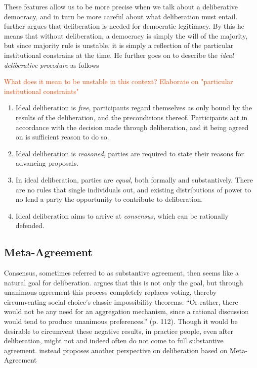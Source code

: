 These features allow us to be more precise when we talk about a deliberative democracy, and in turn be more careful about what deliberation must entail. \citet{cohenDeliberationDemocraticLegimitimacy2002} further argues that deliberation is needed for democratic legitimacy. By this he means that without deliberation, a democracy is simply the will of the majority, but since majority rule is unstable, it is simply a reflection of the particular institutional constrains at the time. He further goes on to describe the \emph{ideal deliberative procedure} as follows

\textcolor{OrangeRed}{What does it mean to be unstable in this context? Elaborate on "particular institutional constraints"}

\begin{enumerate}
	\label{list:ideal-deliberation}
	\setlength\itemsep{1px}
	\item  Ideal deliberation is \emph{free}, participants regard themselves as only bound by the results of the deliberation, and the preconditions thereof. Participants act in accordance with the decision made through deliberation, and it being agreed on is sufficient reason to do so.
	\item  Ideal deliberation is \emph{reasoned}, parties are required to state their reasons for advancing proposals.
	\item  In ideal deliberation, parties are \emph{equal}, both formally and substantively. There are no rules that single individuals out, and existing distributions of power to no lend a party the opportunity to contribute to deliberation.
	\item  Ideal deliberation aims to arrive at \emph{consensus}, which can be rationally defended.
\end{enumerate}

\subsection{Meta-Agreement}
\label{subsection:Meta-agreement}

Consensus, sometimes referred to as substantive agreement, then seems like a
natural goal for deliberation. \citet{elsterMarketForumThree2002} argues that
this is not only the goal, but through unanimous agreement this process
completely replaces voting, thereby circumventing social choice's classic impossibility
theorems: ``Or rather, there would not be any need for an aggregation mechanism,
since a rational discussion would tend to produce unanimous preferences.'' (p.
112). Though it would be desirable to circumvent these negative results,
in practice people, even after deliberation, might not and indeed often do not
come to full substantive agreement. \citet{listTwoConceptsAgreement2002}
instead proposes another perspective  on deliberation based on Meta-Agreement

